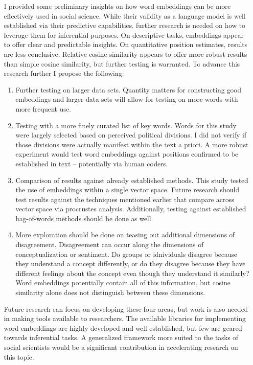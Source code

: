 \documentclass[../embeddings.tex]{subfiles}
\begin{document}
I provided some preliminary insights on how word embeddings can be more effectively used in social science. While their validity as a language model is well established via their predictive capabilities, further research is needed on how to leverage them for inferential purposes. On descriptive tasks, embeddings appear to offer clear and predictable insights. On quantitative position estimates, results are less conclusive. Relative cosine similarity appears to offer more robust results than simple cosine similarity, but further testing is warranted. To advance this research further I propose the following: 
\begin{enumerate}
    \item Further testing on larger data sets. Quantity matters for constructing good embeddings and larger data sets will allow for testing on more words with more frequent use.
    \item Testing with a more finely curated list of key words. Words for this study were largely selected based on perceived political divisions. I did not verify if those divisions were actually manifest within the text a priori. A more robust experiment would test word embeddings against positions confirmed to be established in text – potentially via human coders.
    \item Comparison of results against already established methods. This study tested the use of embeddings within a single vector space. Future research should test results against the techniques mentioned earlier that compare across vector space via procrustes analysis. Additionally, testing against established bag-of-words methods should be done as well. 
    \item More exploration should be done on teasing out additional dimensions of disagreement. Disagreement can occur along the dimensions of conceptualization or sentiment. Do groups or idnividuals disagree because they understand a concept differently, or do they disagree because they have different feelings about the concept even though they understand it similarly? Word embeddings potentially contain all of this information, but cosine similarity alone does not distinguish between these dimensions.  
\end{enumerate}
Future research can focus on developing these four areas, but work is also needed in making tools available to researchers. The available libraries for implementing word embeddings are highly developed and well established, but few are geared towards inferential tasks. A generalized framework more suited to the tasks of social scientists would be a significant contribution in accelerating research on this topic.
\end{document}
